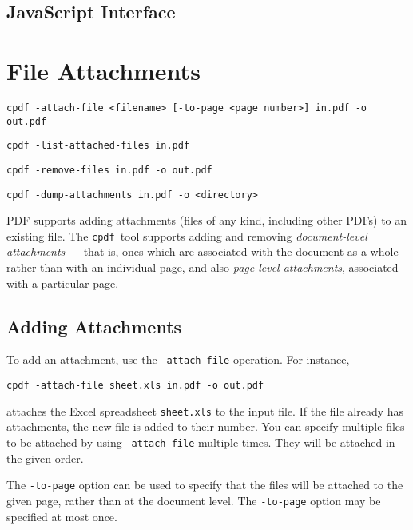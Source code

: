 \documentclass{book}
\newcommand{\cpdf}{\texttt{cpdf}}
\begin{document}
\begin{jscpdflib}
\clearpage
\section*{JavaScript Interface}
\begin{small}\tt

\end{small}
\end{jscpdflib}

\chapter{File Attachments}\label{chap:12}\pagestyle{fancy}
\begin{framed}
  \small\noindent\verb!cpdf -attach-file <filename> [-to-page <page number>] in.pdf -o out.pdf!

  \vspace{1.5mm}
  \small\noindent\verb!cpdf -list-attached-files in.pdf!
 
  \vspace{1.5mm}
  \small\noindent\verb!cpdf -remove-files in.pdf -o out.pdf!

  \vspace{1.5mm}
  \small\noindent\verb!cpdf -dump-attachments in.pdf -o <directory>!
\end{framed}
  PDF supports adding attachments (files of any kind, including other PDFs) to
an existing file. The \cpdf\ tool supports adding and removing \textit{document-level
attachments} --- that is, ones which are associated with the document as a
whole rather than with an individual page, and also \textit{page-level attachments}, associated with a particular page.
  \section{Adding Attachments}
  To add an attachment, use the \texttt{-attach-file} operation. For instance,
  \begin{framed}
  \small\verb!cpdf -attach-file sheet.xls in.pdf -o out.pdf!
  \end{framed}
  \noindent attaches the Excel spreadsheet \texttt{sheet.xls} to the input file. If the file already has attachments, the new file is added to their number. You can specify multiple files to be attached by using \verb!-attach-file! multiple times. They will be attached in the given order.
  
  The \texttt{-to-page} option can be used to specify that the files will be attached to the given page, rather than at the document level. The \texttt{-to-page} option may be specified at most once. 
\end{document}
